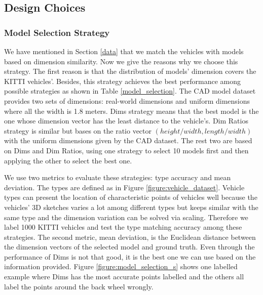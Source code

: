 \subsection{Design Choices}

\subsubsection{Model Selection Strategy}
We have mentioned in Section \ref{data} that we match the vehicles with models based on dimension similarity. Now we give the reasons why we choose this strategy. The first reason is that the distribution of models' dimension covers the KITTI vehicles'. Besides, this strategy achieves the best performance among possible strategies as shown in Table \ref{model_selection}. The CAD model dataset provides two sets of dimensions: real-world dimensions and  uniform dimensions where all the width is 1.8 meters. Dims strategy means that the best model is the one whose dimension vector has the least distance to the vehicle's. Dim Ratios strategy is similar but bases on the ratio vector $(height/width, length/width)$ with the uniform dimensions given by the CAD dataset. The rest two are based on Dims and Dim Ratios, \ie using one strategy to select 10 models first and then applying the other to select the best one.

We use two metrics to evaluate these strategies: type accuracy and mean deviation. The types are defined as in Figure \ref{figure:vehicle_dataset}. Vehicle types can present the location of characteristic points of vehicles well because the vehicles' 3D sketches varies a lot among different types but keeps similar with the same type and the dimension variation can be solved via scaling. Therefore we label 1000 KITTI vehicles and test the type matching accuracy among these strategies. The second metric, mean deviation, is the Euclidean distance between the dimension vectors of the selected model and ground truth. Even through the performance of Dims is not that good, it is the best one we can use based on the information provided. Figure \ref{figure:model_selection_s} shows one labelled example where Dims has the most accurate points labelled and the others all label the points around the back wheel wrongly.

\renewcommand{\arraystretch}{1.2}
\begin{table}[ht]
	\centering
	\caption{Performance of four model selection strategies}
	\label{model_selection}
\end{table}


